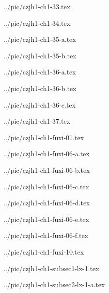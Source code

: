 ../pic/czjh1-ch1-33.tex



../pic/czjh1-ch1-34.tex



../pic/czjh1-ch1-35-a.tex



../pic/czjh1-ch1-35-b.tex



../pic/czjh1-ch1-36-a.tex



../pic/czjh1-ch1-36-b.tex



../pic/czjh1-ch1-36-c.tex



../pic/czjh1-ch1-37.tex



../pic/czjh1-ch1-fuxi-01.tex



../pic/czjh1-ch1-fuxi-06-a.tex



../pic/czjh1-ch1-fuxi-06-b.tex



../pic/czjh1-ch1-fuxi-06-c.tex



../pic/czjh1-ch1-fuxi-06-d.tex



../pic/czjh1-ch1-fuxi-06-e.tex



../pic/czjh1-ch1-fuxi-06-f.tex



../pic/czjh1-ch1-fuxi-10.tex



../pic/czjh1-ch1-subsec1-lx-1.tex



../pic/czjh1-ch1-subsec2-lx-1-a.tex



